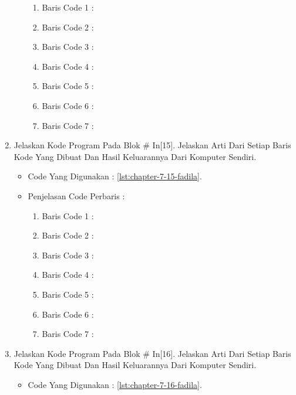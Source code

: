 \begin{enumerate}
\begin{itemize}
\begin{enumerate}
\item Baris Code 1	:
\item Baris Code 2	:
\item Baris Code 3	:
\item Baris Code 4	:
\item Baris Code 5	:
\item Baris Code 6	:
\item Baris Code 7	:
\end{enumerate}
\par
\par
\end{itemize}
\par
\par
\par
\item Jelaskan Kode Program Pada Blok \# In[15]. Jelaskan Arti Dari Setiap Baris Kode Yang Dibuat Dan Hasil Keluarannya Dari Komputer Sendiri.
\begin{itemize}
\item Code Yang Digunakan : \ref{lst:chapter-7-15-fadila}.

\par
\par
\item Penjelasan Code Perbaris	: 
\begin{enumerate}
\item Baris Code 1	:
\item Baris Code 2	:
\item Baris Code 3	:
\item Baris Code 4	:
\item Baris Code 5	:
\item Baris Code 6	:
\item Baris Code 7	:
\end{enumerate}
\par
\end{itemize}
\par
\par
\par
\item Jelaskan Kode Program Pada Blok \# In[16]. Jelaskan Arti Dari Setiap Baris Kode Yang Dibuat Dan Hasil Keluarannya Dari Komputer Sendiri.
\begin{itemize}
\item Code Yang Digunakan : \ref{lst:chapter-7-16-fadila}.


\end{itemize}
\end{enumerate}
